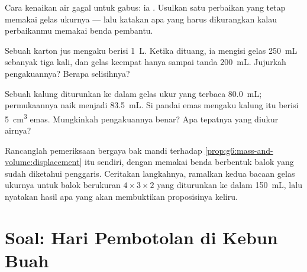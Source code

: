 \begin{exercise}[$\star\star$]\label{exo:g6:mass-and-volume:9}
Cara kenaikan air gagal untuk gabus: ia . Usulkan satu
perbaikan yang tetap memakai gelas ukurnya --- lalu katakan apa yang
harus dikurangkan kalau perbaikanmu memakai benda pembantu.
\end{exercise}

\begin{exercise}[$\star\star$]\label{exo:g6:mass-and-volume:10}
Sebuah karton jus mengaku berisi \qty{1}{L}. Ketika dituang, ia
mengisi gelas \qty{250}{mL} sebanyak tiga kali, dan gelas keempat
hanya sampai tanda \qty{200}{mL}. Jujurkah pengakuannya? Berapa
selisihnya?
\end{exercise}

\begin{exercise}[$\star\star$]\label{exo:g6:mass-and-volume:11}
Sebuah kalung diturunkan ke dalam gelas ukur yang terbaca
\qty{80.0}{mL}; permukaannya naik menjadi \qty{83.5}{mL}. Si pandai
emas mengaku kalung itu berisi \qty{5}{cm^3} emas. Mungkinkah
pengakuannya benar? Apa tepatnya yang diukur airnya?
\end{exercise}

\begin{exercise}[$\star\star\star$]\label{exo:g6:mass-and-volume:12}
Rancanglah pemeriksaan bergaya bak mandi terhadap
\cref{prop:g6:mass-and-volume:displacement} itu sendiri, dengan
memakai benda berbentuk balok yang  sudah diketahui
penggaris. Ceritakan langkahnya, ramalkan kedua bacaan gelas ukurnya
untuk balok berukuran $4 \times 3 \times 2$  yang diturunkan
ke dalam \qty{150}{mL}, lalu nyatakan hasil apa yang akan membuktikan
proposisinya keliru.
\end{exercise}

\section{Soal: Hari Pembotolan di Kebun Buah}

